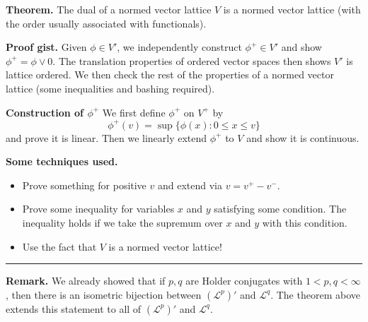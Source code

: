 \documentclass[12pt, letterpaper]{article}
\newcommand{\cL}{{\mathcal L}}
\renewcommand{\i}{\infty}
\begin{document}
\pagestyle{fancy}

\textbf{Theorem.} The dual of a normed vector lattice $V$ is a normed vector lattice (with the order usually associated with functionals).

\textbf{Proof gist.} Given $\phi \in V'$, we independently construct $\phi^+ \in V'$ and show $\phi^+ = \phi \vee 0$. The translation properties of ordered vector spaces then shows $V'$ is lattice ordered. We then check the rest of the properties of a normed vector lattice (some inequalities and bashing required).

\textbf{Construction of $\phi^+$} We first define $\phi^+$ on $V^+$ by
\[
    \phi^+(v) = \sup\{\phi(x): 0 \leq x \leq v\}
\]
and prove it is linear. Then we linearly extend $\phi^+$ to $V$ and show it is continuous.

\textbf{Some techniques used.}
\begin{itemize}
    \item Prove something for positive $v$ and extend via $v = v^+ - v^-$.

    \item Prove some inequality for variables $x$ and $y$ satisfying some condition. The inequality holds if we take the supremum over $x$ and $y$ with this condition.

    \item Use the fact that $V$ is a normed vector lattice!
\end{itemize}

\noindent\rule{\textwidth}{1pt}
\textbf{Remark.} We already showed that if $p,q$ are Holder conjugates with $1 < p,q < \i$, then there is an isometric bijection between $(\cL^p)'$ and $\cL^q$. The theorem above extends this statement to all of $(\cL^p)'$ and $\cL^q$.
\end{document}
